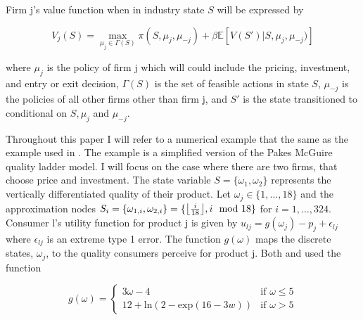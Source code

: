 \documentclass[12pt]{article}
\DeclarePairedDelimiter\floor{\lfloor}{\rfloor}
\begin{document}

Firm j's value function when in industry state $S$ will be expressed by

\begin{equation*}
  V_j(S)=\max_{\mu_j \in \Gamma(S)} \pi(S, \mu_j, \mu_{-j}) + \beta\mathbb{E}[V(S')|S,\mu_{j},\mu_{-j})]
\end{equation*}

where $\mu_j$ is the policy of firm j which will could include the pricing, investment, and entry or exit decision, $\Gamma(S)$ is the set of feasible actions in state $S$, $\mu_{-j}$ is the policies of all other firms other than firm j, and $S'$ is the state transitioned to conditional on $S,\mu_{j}$ and $\mu_{-j}$.

Throughout this paper I will refer to a numerical example that the same as the example used in \citet{2012_Doraszelski_Judd_QuanEcon}. The example is a simplified version of the Pakes McGuire quality ladder model. I will focus on the case where there are two firms, that choose price and investment. The state variable $S=\{\omega_1,\omega_2\}$ represents the vertically differentiated quality of their product. Let $\omega_j \in \{1, \dots ,18 \}$ and the approximation nodes $S_i=\{\omega_{1,i},\omega_{2,i}\}=\{\floor*{\frac{i}{18}},i \mod 18\}$ for $i=1,\dots,324$. Consumer l's utility function for product j is given by $u_{lj}=g(\omega_j) - p_j + \epsilon_{lj}$ where $\epsilon_{lj}$ is an extreme type 1 error. The function $g(\omega)$ maps the discrete states, $\omega_j$, to the quality consumers perceive for product j. Both \citet{1992_Pakes_McGuire_NBER} and \citet{2012_Doraszelski_Judd_QuanEcon} used the function

\begin{equation*}
  g(\omega) =
  \begin{cases}
    3\omega-4 & \text{if } \omega \leq 5\\
    12+\text{ln}(2-\text{exp}(16-3w)) & \text{if } \omega >5
  \end{cases}
\end{equation*}
\end{document}
